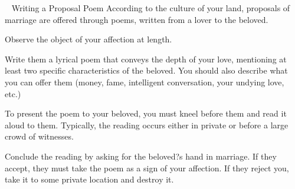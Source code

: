 \documentclass[green]{guildcamp3}
\begin{document}
\    
    \name{\gPoem{}}
	Writing a Proposal Poem
	According to the culture of your land, proposals of marriage are offered through poems, written from a lover to the beloved.
\begin{enum}[Directions]
        \item Observe the object of your affection at length.
         \item Write them a lyrical poem that conveys the depth of your love, mentioning at least two specific characteristics of the beloved. You should also describe what you can offer them (money, fame, intelligent conversation, your undying love, etc.)
         \item To present the poem to your beloved, you must kneel before them and read it aloud to them. Typically, the reading occurs either in private or before a large crowd of witnesses.
        \item Conclude the reading by asking for the beloved?s hand in marriage. If they accept, they must take the poem as a sign of your affection. If they reject you, take it to some private location and destroy it.
        \end{enum}
\end{document}
